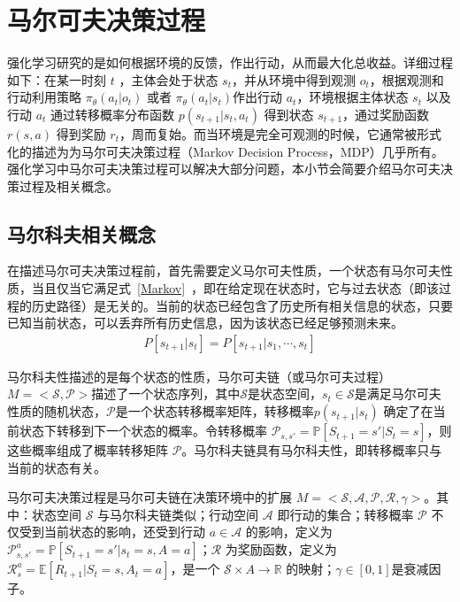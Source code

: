 \section{马尔可夫决策过程}
强化学习研究的是如何根据环境的反馈，作出行动，从而最大化总收益。详细过程如下：在某一时刻 $t$ ，主体会处于状态 $s_t$，并从环境中得到观测 $o_t$，根据观测和行动利用策略 $\pi_\theta(a_t|o_t)$ 或者 $\pi_\theta(a_t|s_t)$作出行动 $a_t$，环境根据主体状态 $s_t$ 以及行动 $a_t$ 通过转移概率分布函数 $p(s_{t+1}| s_t, a_t)$ 得到状态 $s_{t+1}$，通过奖励函数 $r(s, a)$ 得到奖励 $r_t$，周而复始。而当环境是完全可观测的时候，它通常被形式化的描述为为马尔可夫决策过程（Markov Decision Process，MDP）几乎所有。强化学习中马尔可夫决策过程可以解决大部分问题\cite{Sutton1998ReinFORcementL}，本小节会简要介绍马尔可夫决策过程及相关概念。

\subsection{马尔科夫相关概念}

在描述马尔可夫决策过程前，首先需要定义马尔可夫性质，一个状态有马尔可夫性质，当且仅当它满足式~\eqref{Markov}~，即在给定现在状态时，它与过去状态（即该过程的历史路径）是无关的。当前的状态已经包含了历史所有相关信息的状态，只要已知当前状态，可以丢弃所有历史信息，因为该状态已经足够预测未来。
\begin{equation}
\label{Markov}
\begin{aligned}
P[s_{t+1}|s_t]=P[s_{t+1}|s_1,\cdots,s_t]
\end{aligned}
\end{equation}

马尔科夫性描述的是每个状态的性质，马尔可夫链（或马尔可夫过程）$M=<\mathcal{S}, \mathcal{P}>$描述了一个状态序列，其中$\mathcal{S}$是状态空间，$s_t \in \mathcal{S}$是满足马尔可夫性质的随机状态，$\mathcal{P}$是一个状态转移概率矩阵，转移概率$p(s_{t+1}|s_t)$ 确定了在当前状态下转移到下一个状态的概率。令转移概率 $\mathcal{P}_{s, s'}=\mathbb{P}[S_{t+1}=s'|S_t=s]$，则这些概率组成了概率转移矩阵 $\mathcal{P}$。马尔科夫链具有马尔科夫性，即转移概率只与当前的状态有关。

马尔可夫决策过程是马尔可夫链在决策环境中的扩展 $M=<\mathcal{S}, \mathcal{A}, \mathcal{P}, \mathcal{R}, \gamma>$。其中：状态空间 $\mathcal{S}$ 与马尔科夫链类似；行动空间 $\mathcal{A}$ 即行动的集合；转移概率 $\mathcal{P}$ 不仅受到当前状态的影响，还受到行动 $a\in \mathcal{A}$ 的影响，定义为$\mathcal{P}_{s, s'}^{a}=\mathbb{P}[S_{t+1}=s'|s_t=s, A=a]$；$\mathcal{R}$ 为奖励函数，定义为$\mathcal{R}_{s}^{a}=\mathbb{E}[R_{t+1}|S_t=s, A_t=a]$，是一个 $\mathcal{S}\times A\to \mathbb{R}$ 的映射；$\gamma \in [0,1]$是衰减因子。


